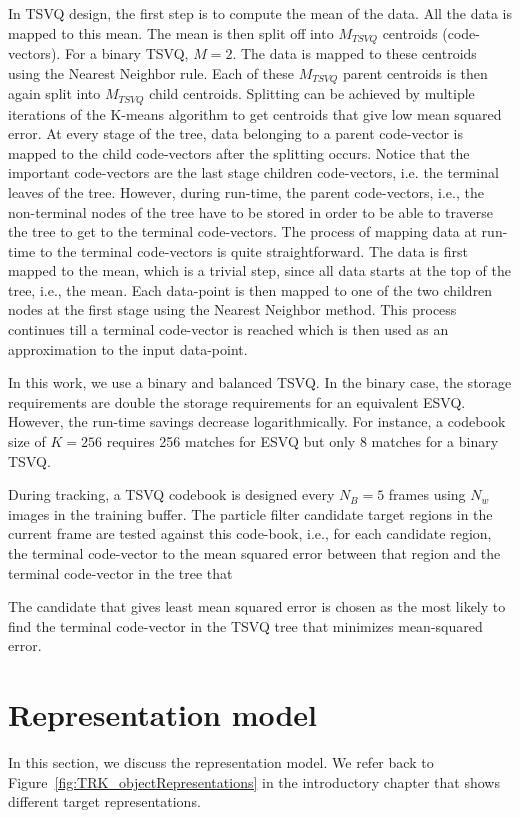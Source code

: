 In TSVQ design, the first step is to compute the mean of the data.  All the data is mapped to this mean.  The mean is then split off into $M_{TSVQ}$ centroids (code-vectors).  For a binary TSVQ, $M=2$.  The data is mapped to these centroids using the Nearest Neighbor rule.  Each of these $M_{TSVQ}$ parent centroids is then again split into $M_{TSVQ}$ child centroids.  Splitting can be achieved by multiple iterations of the K-means algorithm to get centroids that give low mean squared error.  At every stage of the tree, data belonging to a parent code-vector is mapped to the child code-vectors after the splitting occurs.  Notice that the important code-vectors are the last stage children code-vectors, i.e. the terminal leaves of the tree.  However, during run-time, the parent code-vectors, i.e., the non-terminal nodes of the tree have to be stored in order to be able to traverse the tree to get to the terminal code-vectors.  The process of mapping data at run-time to the terminal code-vectors is quite straightforward.  The data is first mapped to the mean, which is a trivial step, since all data starts at the top of the tree, i.e., the mean.  Each data-point is then mapped to one of the two children nodes at the first stage using the Nearest Neighbor method.  This process continues till a terminal code-vector is reached which is then used as an approximation to the input data-point.

In this work, we use a binary and balanced TSVQ.  In the binary case, the storage requirements are double the storage requirements for an equivalent ESVQ.  However, the run-time savings decrease logarithmically.  For instance, a codebook size of $K=256$ requires 256 matches for ESVQ but only 8 matches for a binary TSVQ.  

During tracking, a TSVQ codebook is designed every $N_B=5$ frames using $N_w$ images in the training buffer.  The particle filter candidate target regions in the current frame are tested against this code-book, i.e., for each candidate region, the terminal code-vector  to the mean squared error between that region and the terminal code-vector in the tree that 

The candidate that gives least mean squared error is chosen as the most likely  to find the terminal code-vector in the TSVQ tree that minimizes mean-squared error.  


\section{Representation model}
\label{Sec:Representation_model}
In this section, we discuss the representation model.  We refer back to Figure~\ref{fig:TRK_objectRepresentations} in the introductory chapter that shows different target representations.  




